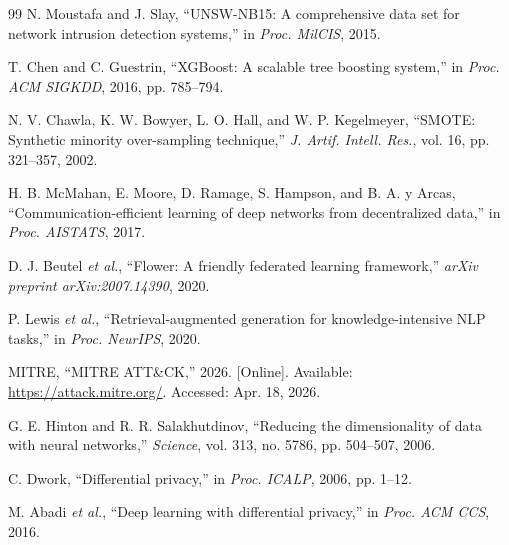 \begin{thebibliography}{99}
N. Moustafa and J. Slay, ``UNSW-NB15: A comprehensive data set for network intrusion detection systems,'' in \emph{Proc. MilCIS}, 2015.

T. Chen and C. Guestrin, ``XGBoost: A scalable tree boosting system,'' in \emph{Proc. ACM SIGKDD}, 2016, pp. 785--794.

N. V. Chawla, K. W. Bowyer, L. O. Hall, and W. P. Kegelmeyer, ``SMOTE: Synthetic minority over-sampling technique,'' \emph{J. Artif. Intell. Res.}, vol. 16, pp. 321--357, 2002.

H. B. McMahan, E. Moore, D. Ramage, S. Hampson, and B. A. y Arcas, ``Communication-efficient learning of deep networks from decentralized data,'' in \emph{Proc. AISTATS}, 2017.

D. J. Beutel \emph{et al.}, ``Flower: A friendly federated learning framework,'' \emph{arXiv preprint arXiv:2007.14390}, 2020.

P. Lewis \emph{et al.}, ``Retrieval-augmented generation for knowledge-intensive NLP tasks,'' in \emph{Proc. NeurIPS}, 2020.

MITRE, ``MITRE ATT\&CK,'' 2026. [Online]. Available: \url{https://attack.mitre.org/}. Accessed: Apr. 18, 2026.

G. E. Hinton and R. R. Salakhutdinov, ``Reducing the dimensionality of data with neural networks,'' \emph{Science}, vol. 313, no. 5786, pp. 504--507, 2006.

C. Dwork, ``Differential privacy,'' in \emph{Proc. ICALP}, 2006, pp. 1--12.

M. Abadi \emph{et al.}, ``Deep learning with differential privacy,'' in \emph{Proc. ACM CCS}, 2016.
\end{thebibliography}
